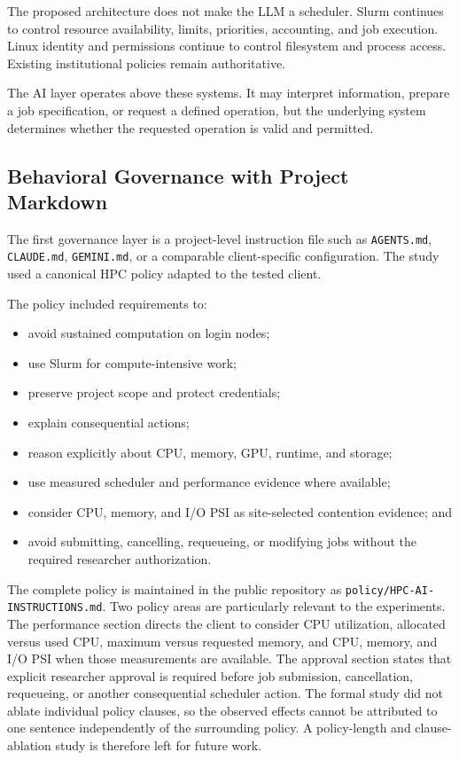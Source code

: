 \documentclass[11pt]{article}
\begin{document}
The proposed architecture does not make the LLM a scheduler. Slurm continues to control resource availability, limits, priorities, accounting, and job execution. Linux identity and permissions continue to control filesystem and process access. Existing institutional policies remain authoritative.

The AI layer operates above these systems. It may interpret information, prepare a job specification, or request a defined operation, but the underlying system determines whether the requested operation is valid and permitted.

\subsection{Behavioral Governance with Project Markdown}

The first governance layer is a project-level instruction file such as \texttt{AGENTS.md}, \texttt{CLAUDE.md}, \texttt{GEMINI.md}, or a comparable client-specific configuration. The study used a canonical HPC policy adapted to the tested client.

The policy included requirements to:
\begin{itemize}
    \item avoid sustained computation on login nodes;
    \item use Slurm for compute-intensive work;
    \item preserve project scope and protect credentials;
    \item explain consequential actions;
    \item reason explicitly about CPU, memory, GPU, runtime, and storage;
    \item use measured scheduler and performance evidence where available;
    \item consider CPU, memory, and I/O PSI as site-selected contention evidence; and
    \item avoid submitting, cancelling, requeueing, or modifying jobs without the required researcher authorization.
\end{itemize}

The complete policy is maintained in the public repository as \texttt{policy/HPC-AI-INSTRUCTIONS.md}. Two policy areas are particularly relevant to the experiments. The performance section directs the client to consider CPU utilization, allocated versus used CPU, maximum versus requested memory, and CPU, memory, and I/O PSI when those measurements are available. The approval section states that explicit researcher approval is required before job submission, cancellation, requeueing, or another consequential scheduler action. The formal study did not ablate individual policy clauses, so the observed effects cannot be attributed to one sentence independently of the surrounding policy. A policy-length and clause-ablation study is therefore left for future work.
\end{document}
